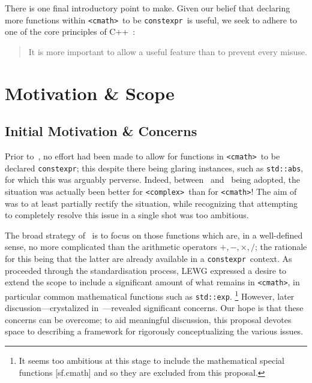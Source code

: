 \documentclass[prd,twocolumn,amsmath,amssymb,nofootinbib,eqsecnum]{revtex4-1}
\newcommand{\constexpr}{\code{constexpr}\xspace}
\newcommand{\code}[1]{{\tt #1}}
\newcommand{\header}[1]{{\tt <#1>}}
\newcommand{\cmath}{\header{cmath}}
\newcommand{\complex}{\header{complex}}
\newcommand{\Operators}{\ensuremath{+,-,\times,/}}
\begin{document}
There is one final introductory point to make.
Given our belief that declaring more functions within \cmath\ to be \constexpr\ is useful, we seek to adhere to one of the core principles of C++~\cite{DandE}:
\begin{quote}
	It is more important to allow a useful feature than to prevent every misuse.
\end{quote}

\section{Motivation \& Scope}
\label{sec:Motivation}

\subsection{Initial Motivation \& Concerns}

Prior to~\cite{Rosten-constexpr}, no effort had been made to allow for functions in \cmath\ to be declared \constexpr; this despite there being glaring instances, such as \code{std::abs}, for which this was arguably perverse. Indeed, between~\cite{AP-complex} and~\cite{Rosten-constexpr} being adopted, the situation was actually been better for \complex\ than for \cmath! The aim of~\cite{Rosten-constexpr} was to at least partially rectify the situation, while recognizing that attempting to completely resolve this issue in a single shot was too ambitious.

The broad strategy of~\cite{Rosten-constexpr} is to focus on those functions which are, in a well-defined sense, no more complicated than the arithmetic operators \Operators; the rationale for this being that the latter are already available in a \constexpr\ context.
As~\cite{Rosten-constexpr} proceeded through the standardisation process, LEWG expressed a desire 
to extend the scope to include a significant amount of what remains in \cmath, in particular common mathematical functions such as \code{std::exp}.%
\footnote{It seems too ambitious at this stage to include the mathematical special functions [sf.cmath] and so they are excluded from this proposal.}
However, later discussion---crystalized in~\cite{Timmons-Less}---revealed significant concerns. Our hope is that these concerns can be overcome; to aid meaningful discussion, this proposal devotes space to describing a framework
for rigorously conceptualizing the various issues.
\end{document}
